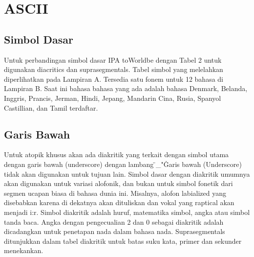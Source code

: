 \section{ASCII}
\subsection{Simbol Dasar}
Untuk perbandingan simbol dasar IPA toWorldbe dengan  Tabel 2 untuk digunakan diacritics dan suprasegmentals. Tabel simbol yang melelahkan diperlihatkan pada Lampiran A. Tersedia satu fonem untuk 12 bahasa di Lampiran B. Saat ini bahasa bahasa yang ada adalah bahasa Denmark, Belanda, Inggris, Prancis, Jerman, Hindi, Jepang, Mandarin Cina, Rusia, Spanyol Castillian, dan Tamil terdaftar.
\subsection{Garis Bawah}
Untuk atopik khusus akan ada diakritik yang terkait dengan simbol utama dengan garis bawah (underscore) dengan lambang \"_"\. Garis bawah (Underscore) tidak akan digunakan untuk tujuan lain. Simbol dasar dengan diakritik umumnya akan digunakan untuk variasi alofonik, dan bukan untuk simbol fonetik dari segmen ucapan biasa di
bahasa dunia ini.
Misalnya, alofon labialized  yang disebabkan karena  di dekatnya
akan dituliskan  dan vokal yang raptical akan menjadi i:r. Simbol diakritik adalah huruf, matematika simbol, angka atau simbol tanda baca. Angka dengan pengecualian 2 dan 0 sebagai diakritik adalah
dicadangkan untuk penetapan nada dalam bahasa nada.
Suprasegmentals ditunjukkan dalam tabel diakritik untuk batas suku kata, primer dan sekunder menekankan. 